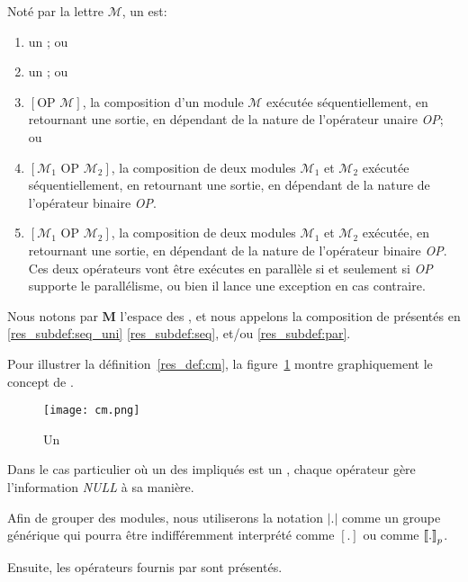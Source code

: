 \begin{lemma}
\label{res_def:cm}
Noté par la lettre $\mathcal{M}$, un {\bf \m} est:
\begin{enumerate}\renewcommand{\labelitemi}{\scriptsize$\blacksquare$}
\item un \infr{\om{}}; ou
\item un \infr{\opch{}}; ou
\item $\left[\mbox{OP } \mathcal{M}\right]$, la composition d'un module $\mathcal{M}$ exécutée séquentiellement, en retournant une sortie, en dépendant de la nature de l'opérateur unaire \emph{OP}; ou \label{res_subdef:seq_uni}
\item $\left[\mathcal{M}_1 \mbox{ OP } \mathcal{M}_2\right]$, la composition de deux modules $\mathcal{M}_1$ et $\mathcal{M}_2$ exécutée séquentiellement, en retournant une sortie, en dépendant de la nature de l'opérateur binaire \emph{OP}.\label{res_subdef:seq}
\item $\left[\mathcal{M}_1 \mbox{ OP } \mathcal{M}_2\right]$, la composition de deux modules $\mathcal{M}_1$ et $\mathcal{M}_2$ exécutée, en retournant une sortie, en dépendant de la nature de l'opérateur binaire \emph{OP}. Ces deux opérateurs vont être exécutes en parallèle si et seulement si \emph{OP} supporte le parallélisme, ou bien il lance une exception en cas contraire.\label{res_subdef:par}
\end{enumerate}
Nous notons par $\mathbf{M}$ l'espace des \infr{\ms}, et nous appelons \infr{\cms{}} la composition de \ms{} présentés en \ref{res_subdef:seq_uni} \ref{res_subdef:seq}, et/ou \ref{res_subdef:par}.
\end{lemma}

Pour illustrer la définition~\ref{res_def:cm}, la figure~\ref{res_fig:cm} montre graphiquement le concept de \cm.
\begin{figure}
	\centering
	\texttt{[image: cm.png]} %
	\caption[]{Un \infr{\cm}}
	\label{res_fig:cm}
\end{figure}%

Dans le cas particulier où un des \infr{\cms{}} impliqués est un \infr{\opch{}}, chaque opérateur gère l'information {\it NULL} à sa manière.

Afin de grouper des modules, nous utiliserons la notation $\left|.\right|$ comme un groupe générique qui pourra être indifféremment interprété comme $[.]$ ou comme $\left\llbracket . \right\rrbracket_p$.

Ensuite, les opérateurs fournis par \posl{} sont présentés. 

